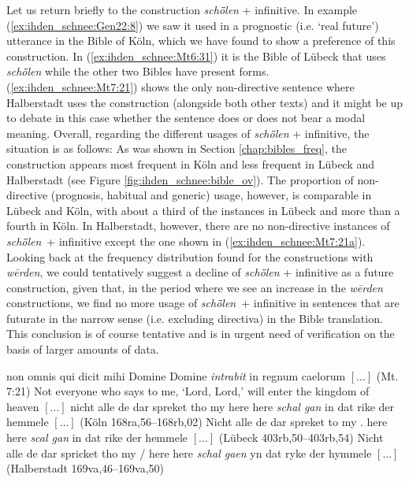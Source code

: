 \documentclass[output=paper,colorlinks,citecolor=brown]{langscibook}
\begin{document}
Let us return briefly to the construction \textit{schȫlen} + infinitive. In example (\ref{ex:ihden_schnee:Gen22:8}) we saw it used in a prognostic (i.e. `real future') utterance in the Bible of Köln, which we have found to show a preference of this construction. In (\ref{ex:ihden_schnee:Mt6:31}) it is the Bible of Lübeck that uses \textit{schȫlen} while the other two Bibles have present forms. (\ref{ex:ihden_schnee:Mt7:21}) shows the only non-directive sentence where Halberstadt uses the construction (alongside both other texts) and it might be up to debate in this case whether the sentence does or does not bear a modal meaning. Overall, regarding the different usages of  \textit{schȫlen} + infinitive, the situation is as follows: As was shown in Section \ref{chap:bibles_freq}, the construction appears most frequent in Köln and less frequent in Lübeck and Halberstadt (see Figure \ref{fig:ihden_schnee:bible_ov}). The proportion of non-directive (prognosis, habitual and generic) usage, however, is comparable in Lübeck and Köln, with about a third of the instances in Lübeck and more than a fourth in Köln. In Halberstadt, however, there are no non-directive instances of \textit{schȫlen}~+ infinitive except the one shown in (\ref{ex:ihden_schnee:Mt7:21a}). Looking back at the frequency distribution found for the constructions with \textit{wērden}, we could tentatively suggest a decline of \textit{schȫlen} + infinitive as a future construction, given that, in the period where we see an increase in the \textit{wērden} constructions, we find no more usage of \textit{schȫlen}~+ infinitive in sentences that are futurate in the narrow sense (i.e. excluding directiva) in the Bible translation. This conclusion is of course tentative and is in urgent need of verification on the basis of larger amounts of data.   

\ea non omnis qui dicit mihi Domine Domine \textit{intrabit} in regnum caelorum $[\ldots]$ (Mt. 7:21) \label{ex:ihden_schnee:Mt7:21}
\exi{} Not everyone who says to me, ‘Lord, Lord,’ will enter the kingdom of heaven $[\ldots]$ 
\ea nicht alle de dar spreket tho my here here \textit{schal gan }in dat rike der hemmele $[\ldots]$ (Köln 168ra,56--168rb,02) \label{ex:ihden_schnee:Mt7:21b}
\ex Nicht alle de dar spreket to my . here here \textit{scal gan} in dat rike der hemmele $[\ldots]$ (Lübeck 403rb,50--403rb,54) \label{ex:ihden_schnee:Mt7:21c}
\ex Nicht alle de dar spricket tho my / here here \textit{schal gaen} yn dat ryke der hymmele $[\ldots]$ (Halberstadt 169va,46--169va,50) \label{ex:ihden_schnee:Mt7:21a}
\z
\z
\end{document}
